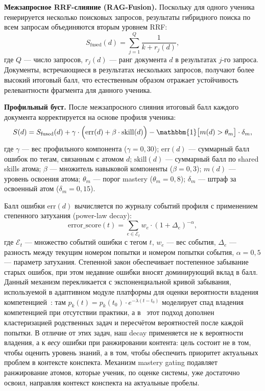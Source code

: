 \documentclass[a4paper,12pt]{extarticle}
\begin{document}
\textbf{Межзапросное RRF-слияние (RAG-Fusion).} Поскольку для одного ученика
генерируется несколько поисковых запросов, результаты гибридного поиска по всем
запросам объединяются вторым уровнем RRF:
\begin{equation}
    \label{eq:rrf_fusion}
    S_{\mathrm{fused}}(d) = \sum_{j=1}^{Q} \frac{1}{k + r_j(d)},
\end{equation}
где $Q$ --- число запросов, $r_j(d)$ --- ранг документа $d$ в результатах $j$-го
запроса. Документы, встречающиеся в результатах нескольких запросов, получают более
высокий итоговый балл, что естественным образом отражает устойчивость релевантности
фрагмента для данного ученика.

\textbf{Профильный буст.} После межзапросного слияния итоговый балл каждого
документа корректируется на основе профиля ученика:
\begin{equation}
    \label{eq:profile_boost}
    S(d) = S_{\mathrm{fused}}(d) + \gamma \cdot
        \Bigl(\mathrm{err}(d) + \beta \cdot \mathrm{skill}(d)\Bigr)
        - \mathbbm{1}\bigl[m(d) > \theta_m\bigr] \cdot \delta_m,
\end{equation}
где $\gamma$ --- вес профильного компонента ($\gamma = 0{,}30$);
$\mathrm{err}(d)$ --- суммарный балл ошибок по тегам, связанным с атомом $d$;
$\mathrm{skill}(d)$ --- суммарный балл по shared skills атома;
$\beta$ --- множитель навыковой компоненты ($\beta = 0{,}3$);
$m(d)$ --- уровень освоения атома; $\theta_m$ --- порог mastery ($\theta_m = 0{,}8$);
$\delta_m$ --- штраф за освоенный атом ($\delta_m = 0{,}15$).

Балл ошибки $\mathrm{err}(d)$ вычисляется по журналу событий профиля с
применением степенного затухания (power-law decay):
\begin{equation}
    \label{eq:decay}
    \mathrm{error\_score}(t) = \sum_{e \in \mathcal{E}_t} w_e \cdot (1 + \Delta_e)^{-\alpha},
\end{equation}
где $\mathcal{E}_t$ --- множество событий ошибки с тегом $t$, $w_e$ --- вес события,
$\Delta_e$ --- разность между текущим номером попытки и номером попытки события,
$\alpha = 0{,}5$ --- параметр затухания. Степенной закон обеспечивает постепенное
забывание старых ошибок, при этом недавние ошибки вносят доминирующий вклад в балл.
Данный механизм перекликается с экспоненциальной кривой забывания, используемой
в адаптивном модуле платформы для оценки вероятности владения
компетенцией~\cite{tarasov2025adaptive}: там $p_k(t) = p_k(t_0)\cdot e^{-\lambda(t-t_0)}$
моделирует спад владения компетенцией при отсутствии практики, а в~\cite{agarev2025trajectories}
этот подход дополнен кластеризацией родственных задач и пересчётом вероятностей после
каждой попытки. В отличие от этих задач, наш decay применяется не к вероятности
владения, а к \textit{весу} ошибки при ранжировании контента: цель состоит не в том,
чтобы оценить уровень знаний, а в том, чтобы обеспечить приоритет актуальных
проблем в контексте конспекта.
Механизм mastery gating подавляет ранжирование атомов, которые ученик, по оценке
системы, уже достаточно освоил, направляя контекст конспекта на актуальные пробелы.
\end{document}
